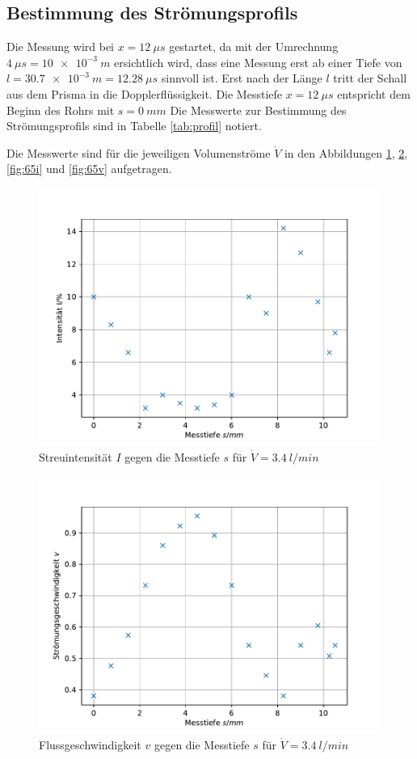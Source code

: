 \subsection{Bestimmung des Strömungsprofils}
Die Messung wird bei $x=\SI{12}{\mu s}$ gestartet, da mit der Umrechnung $\SI{4}{\mu s}= \SI{10e-3}{m}$ ersichtlich wird, dass eine Messung erst ab einer Tiefe von $l=\SI{30.7e-3}{m}=\SI{12.28}{\mu s}$ sinnvoll ist.
Erst nach der Länge $l$ tritt der Schall aus dem Prisma in die Dopplerflüssigkeit.
Die Messtiefe $x=\SI{12}{\mu s}$ entspricht dem Beginn des Rohrs mit $s=\SI{0}{mm}$
Die Messwerte zur Bestimmung des Strömungsprofils sind in Tabelle \ref{tab:profil} notiert.

Die Messwerte sind für die jeweiligen Volumenströme $\dot{V}$ in den Abbildungen \ref{fig:40i}, \ref{fig:40v}, \ref{fig:65i} und \ref{fig:65v} aufgetragen.
\begin{figure}[h!]
  \centering
  \includegraphics[width=\textwidth]{40prozi.pdf}
  \caption{Streuintensität $I$ gegen die Messtiefe $s$ für $\dot{V}=\SI{3,4}{l/min}$}
  \label{fig:40i}
\end{figure}
%
\begin{figure}[h!]
  \centering
  \includegraphics[width=\textwidth]{40prozv.pdf}
  \caption{Flussgeschwindigkeit $v$ gegen die Messtiefe $s$ für $\dot{V}=\SI{3,4}{l/min}$}
  \label{fig:40v}
\end{figure}
